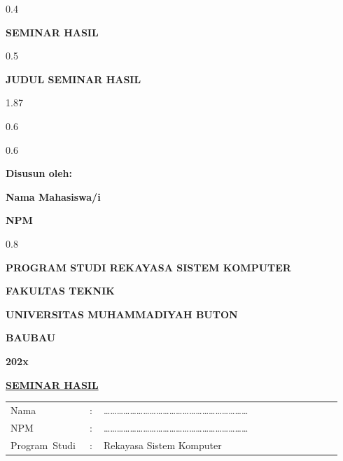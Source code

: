 \thispagestyle{empty}
\begin{ruang}{0.4}\end{ruang}
\begin{sampulbesar}
\textbf{SEMINAR HASIL}
\end{sampulbesar}
\begin{ruang}{0.5}\end{ruang}
\begin{sampulbesar}
\textbf{JUDUL SEMINAR HASIL}
\end{sampulbesar}
\begin{ruang}{1.87}\end{ruang}
\begin{ruang}{0.6}\end{ruang}
\begin{tengah}
\logo{4.5cm}
\end{tengah}
\begin{ruang}{0.6}\end{ruang}
\begin{sampulsedang}
\textbf{Disusun oleh:}

\textbf{Nama Mahasiswa/i}

\textbf{NPM}
\end{sampulsedang}
\begin{ruang}{0.8}\end{ruang}
\begin{sampulsedang}
\textbf{PROGRAM STUDI REKAYASA SISTEM KOMPUTER}

\textbf{FAKULTAS TEKNIK}

\textbf{UNIVERSITAS MUHAMMADIYAH BUTON}

\textbf{BAUBAU}

\textbf{202x}
\end{sampulsedang}
\begin{halamanbaru}\end{halamanbaru}

\thispagestyle{empty}
\begin{tengah}
\textbf{\underline{SEMINAR HASIL}}
\end{tengah}

\begin{tanpagaris}
\begin{longtable}{@{}p{0.22\linewidth}p{0.04\linewidth}p{0.68\linewidth}@{}}
Nama & : & ………………………………………………………… \\[6pt]
NPM & : & ………………………………………………………… \\[6pt]
\mbox{Program Studi} & : & Rekayasa Sistem Komputer \\
\end{longtable}
\end{tanpagaris}

